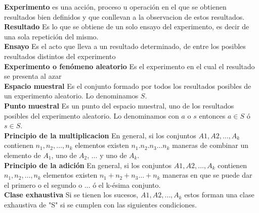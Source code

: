 \documentclass[10pt,a4paper]{article}
\begin{document}
\textbf{Experimento} es una acción, proceso u operación en el que se obtienen resultados bien definidos y que conllevan a la observacion de estos resultados.\\

\textbf{Resultado} Es lo que se obtiene de un solo ensayo del experimento, es decir de una sola repetición del mismo.\\

\textbf{Ensayo} Es el acto que lleva a un resultado determinado, de entre los posibles resultados distintos del experimento\\

\textbf{Experimento o fenómeno aleatorio} Es el experimento en el cual el resultado se presenta al azar\\

\textbf{Espacio muestral} Es el conjunto formado por todos los resultados posibles de un experimento aleatorio. Lo denominamos $S$.\\

\textbf{Punto muestral} Es un punto del espacio muestral, uno de los resultados posibles del experimento aleatorio. Lo denominamos con $a$ o $s$ entonces $a\in S$ ó $s \in S$.\\

\textbf{Principio de la multiplicacion} En general, si los conjuntos $A1,A2,\dots,A_k$ contienen $n_1,n_2,\dots,n_k$ elementos existen $n_1.n_2.n_3\dots n_k$ maneras de combinar un elemento de $A_1$, uno de $A_2$, $\dots$ y uno de $A_k$.\\

\textbf{Principio de la adición} En general, si los conjuntos $A1,A2,\dots,A_k$ contienen $n_1,n_2,\dots,n_k$ elementos existen $n_1+n_2+n_3\dots+n_k$ maneras en que se puede dar el primero o el segundo o $\dots$ ó el k-ésima conjunto. \\

\textbf{Clase exhaustiva} Si se tienen los sucesos, $A1,A2,\dots,A_k$ estos forman una clase exhaustiva de "S" si se cumplen con las siguientes condiciones.\\
\end{document}
